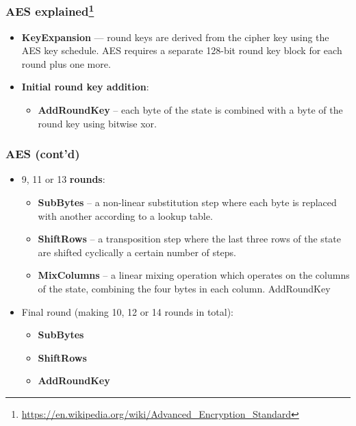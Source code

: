 \documentclass[
hyperref={pdfpagelabels=false}
,xcolor=table
]
{beamer}
\begin{document}
\begin{frame}[fragile]
  \frametitle{AES explained\footnote{\url{https://en.wikipedia.org/wiki/Advanced_Encryption_Standard}}}

  \begin{itemize}
  \item \textbf{KeyExpansion} --- round keys are derived from the
    cipher key using the AES key schedule. AES requires a separate
    128-bit round key block for each round plus one more.

    
  \item \textbf{Initial round key addition}:

    \begin{itemize}
    \item \textbf{AddRoundKey} – each byte of the state is combined with a byte
      of the round key using bitwise xor.
    \end{itemize}

  \end{itemize}
\end{frame}



\begin{frame}
  \frametitle{AES (cont'd)}
  \begin{itemize}
  \item 9, 11 or 13 \textbf{rounds}:
    \begin{itemize}
    \item \textbf{SubBytes} – a non-linear substitution step where each byte is
      replaced with another according to a lookup table.  
    \item \textbf{ShiftRows} –
      a transposition step where the last three rows of the state are
      shifted cyclically a certain number of steps.  
    \item \textbf{MixColumns} – a
      linear mixing operation which operates on the columns of the
      state, combining the four bytes in each column.
      AddRoundKey
    \end{itemize}

  \item Final round (making 10, 12 or 14 rounds in total):
    \begin{itemize}
    \item \textbf{SubBytes}
    \item \textbf{ShiftRows}
    \item \textbf{AddRoundKey}
    \end{itemize}
  \end{itemize}
  
\end{frame}
\end{document}
